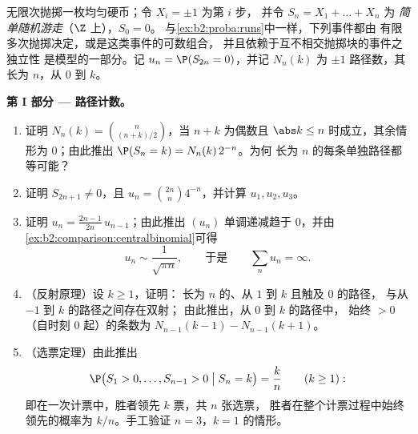 \begin{problem}\label{pb:b2:proba:1}
无限次抛掷一枚均匀硬币；令 $X_i = \pm1$ 为第 $i$ 步，
并令 $S_n = X_1 + \dots + X_n$ 为
\emph{简单随机游走}（$\Z$ 上），$S_0 = 0$。
与\cref{ex:b2:proba:runs}中一样，下列事件都由
有限多次抛掷决定，或是这类事件的可数组合，
并且依赖于互不相交抛掷块的事件之独立性
是模型的一部分。记 $u_n =
\P(S_{2n} = 0)$，并记 $N_n(k)$ 为
$\pm1$ 路径数，其长为 $n$，从 $0$ 到 $k$。

\medskip
\noindent\textbf{第 I 部分 --- 路径计数。}
\begin{enumerate}
  \item 证明 $N_n(k) = \binom{n}{(n+k)/2}$，当 $n + k$
        为偶数且 $\abs k \leq n$ 时成立，其余情形为 $0$；由此推出
        $\P(S_n = k) = N_n(k)\,2^{-n}$。为何
        长为 $n$ 的每条单独路径都等可能？
  \item 证明 $S_{2n+1} \neq 0$，且 $u_n =
        \binom{2n}{n}4^{-n}$，并计算 $u_1, u_2, u_3$。
  \item 证明 $u_n = \frac{2n-1}{2n}\,u_{n-1}$；由此推出
        $(u_n)$ 单调递减趋于 $0$，并由
        \cref{ex:b2:comparison:centralbinomial}可得
        \[
        u_n \sim \frac{1}{\sqrt{\pi n}},
        \qquad\text{于是}\qquad
        \sum_n u_n = \infty .
        \]
  \item （反射原理）设 $k \geq 1$，证明：
        长为 $n$ 的、从 $1$ 到 $k$ 且触及 $0$ 的路径，
        与从 $-1$ 到 $k$ 的路径之间存在双射；
        由此推出，从 $0$ 到 $k$ 的路径中，
        始终 $> 0$（自时刻 $0$ 起）的条数为 $N_{n-1}(k-1) -
        N_{n-1}(k+1)$。
  \item （选票定理）由此推出
        \[
        \P\bigl(S_1 > 0, \dots, S_{n-1} > 0 \bigm| S_n =
        k\bigr) = \frac kn \qquad (k \geq 1) :
        \]
        即在一次计票中，胜者领先 $k$ 票，共 $n$ 张选票，
        胜者在整个计票过程中始终领先的概率为
        $k/n$。手工验证 $n = 3$，$k =
        1$ 的情形。
\end{enumerate}


\end{problem}
